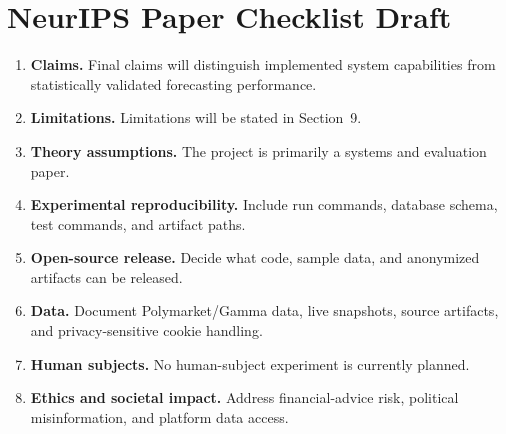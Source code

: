 \section*{NeurIPS Paper Checklist Draft}

\begin{enumerate}[leftmargin=*]
  \item \textbf{Claims.} \answerTODO{} Final claims will distinguish implemented system capabilities from statistically validated forecasting performance.
  \item \textbf{Limitations.} \answerTODO{} Limitations will be stated in Section~9.
  \item \textbf{Theory assumptions.} \answerNA{} The project is primarily a systems and evaluation paper.
  \item \textbf{Experimental reproducibility.} \answerTODO{} Include run commands, database schema, test commands, and artifact paths.
  \item \textbf{Open-source release.} \answerTODO{} Decide what code, sample data, and anonymized artifacts can be released.
  \item \textbf{Data.} \answerTODO{} Document Polymarket/Gamma data, live snapshots, source artifacts, and privacy-sensitive cookie handling.
  \item \textbf{Human subjects.} \answerNA{} No human-subject experiment is currently planned.
  \item \textbf{Ethics and societal impact.} \answerTODO{} Address financial-advice risk, political misinformation, and platform data access.
\end{enumerate}
